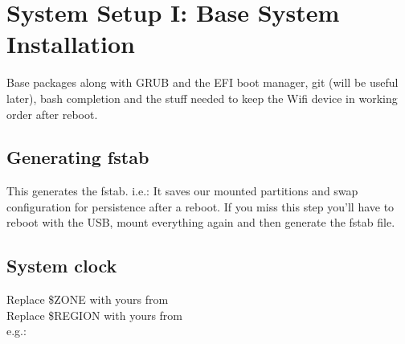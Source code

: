 
\section{System Setup I: Base System Installation}

\begin{blocksection}
	Base packages along with GRUB and the EFI boot manager, git (will be useful later), bash completion and the stuff needed to keep the Wifi device in working order after reboot.
\end{blocksection}

\subsection{Generating fstab}

\begin{blocksection}
	This generates the fstab. i.e.: It saves our mounted partitions and swap configuration for persistence after a reboot. If you miss this step you'll have to reboot with the USB, mount everything again and then generate the fstab file.
\end{blocksection}

\subsection{System clock}

\begin{blocksection}
	Replace \textcolor{codekeyword1}{\$ZONE} with yours from \\
	Replace \textcolor{codekeyword1}{\$REGION} with yours from \\
	e.g.: 
\end{blocksection}

